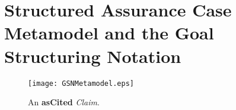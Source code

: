 \section{Structured Assurance Case Metamodel and the Goal Structuring Notation}

\begin{figure}
	\centering
	\texttt{[image: GSNMetamodel.eps]}
	\caption{An \textbf{asCited} \textit{Claim}.}
	\label{fig:asCitedClaim}
\end{figure}